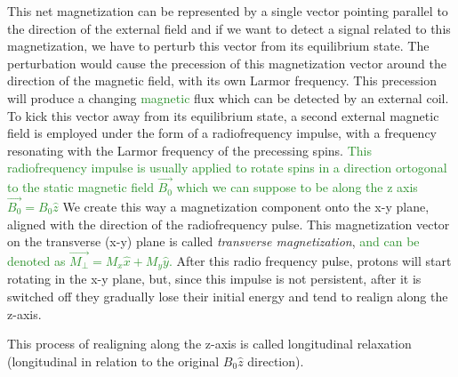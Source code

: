 \documentclass[11pt]{report}
\begin{document}
This net magnetization can be represented by a single vector pointing parallel to the direction of the external field and if we want to detect a signal related to this magnetization, we have to perturb this vector from its equilibrium state.
The perturbation would cause the precession of this magnetization vector around the direction of the magnetic field, with its own Larmor frequency.
This precession will produce a changing \textcolor{ForestGreen}{magnetic} flux which can be detected by an external coil.
To kick this vector away from its equilibrium state, a second external magnetic field is employed under the form of a radiofrequency impulse, with a frequency resonating with the Larmor frequency of the precessing spins.
\textcolor{ForestGreen}{
This radiofrequency impulse is usually applied to rotate spins in a direction ortogonal to the static magnetic field $\vec{B_0}$ which we can suppose to be along the z axis $\vec{B_0} = B_0 \hat z$
}
We create this way a magnetization component onto the x-y plane, aligned with the direction of the radiofrequency pulse.
This magnetization vector on the transverse (x-y) plane is called \emph{transverse magnetization},\textcolor{ForestGreen}{ and can be denoted as $\vec{M_\perp} = M_x \hat x + M_y \hat y$.}
After this radio frequency pulse, protons will start rotating in the x-y plane, but, since this impulse is not persistent, after it is switched off they gradually lose their initial energy and tend to realign along the z-axis.

This process of realigning along the z-axis is called longitudinal relaxation (longitudinal in relation to the original $B_0 \hat z$ direction).
\end{document}
